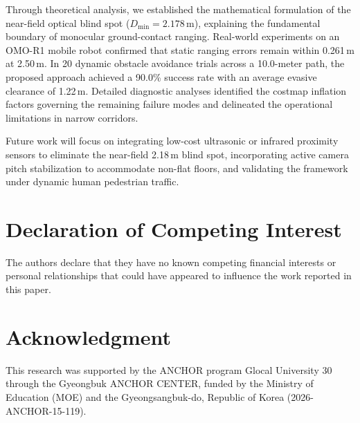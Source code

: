 \documentclass[preprint,12pt]{elsarticle}
\begin{document}
Through theoretical analysis, we established the mathematical formulation of the near-field optical blind spot ($D_{\min} = 2.178$\,m), explaining the fundamental boundary of monocular ground-contact ranging. Real-world experiments on an OMO-R1 mobile robot confirmed that static ranging errors remain within 0.261\,m at 2.50\,m. In 20 dynamic obstacle avoidance trials across a 10.0-meter path, the proposed approach achieved a 90.0\% success rate with an average evasive clearance of 1.22\,m. Detailed diagnostic analyses identified the costmap inflation factors governing the remaining failure modes and delineated the operational limitations in narrow corridors.

Future work will focus on integrating low-cost ultrasonic or infrared proximity sensors to eliminate the near-field 2.18\,m blind spot, incorporating active camera pitch stabilization to accommodate non-flat floors, and validating the framework under dynamic human pedestrian traffic.

\section*{Declaration of Competing Interest}
The authors declare that they have no known competing financial interests or personal relationships that could have appeared to influence the work reported in this paper.

\section*{Acknowledgment}
This research was supported by the ANCHOR program Glocal University 30 through the Gyeongbuk ANCHOR CENTER, funded by the Ministry of Education (MOE) and the Gyeongsangbuk-do, Republic of Korea (2026-ANCHOR-15-119).



\end{document}
